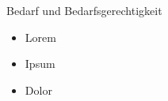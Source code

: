 \documentclass[xcolor=table,9pt,aspectratio=169]{beamer}
\begin{document}
\begin{frame}{\vspace*{10mm}Bedarf und Bedarfsgerechtigkeit}
\begin{multicols}{2}
\begin{itemize}
   \item Lorem
   \item Ipsum
   \item Dolor
\end{itemize}
\vfill

\begin{center}
   \vspace{1cm}
   \vspace{1cm}
\end{center}
\end{multicols}
\end{frame}
\end{document}
